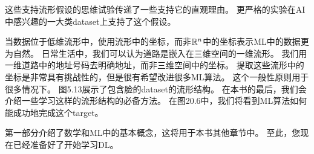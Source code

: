 
这些支持流形假设的思维试验传递了一些支持它的直观理由。
更严格的实验\citep{Cayton-2005,Narayanan+Mitter-NIPS2010,Scholkopf98-book,Roweis2000-lle-small,Tenenbaum2000-isomap,Brand2003,Belkin+Niyogi-nips2003,Donoho+Carrie-03,Weinberger04a}在\gls{AI}中感兴趣的一大类\gls{dataset}上支持了这个假设。

当数据位于低维流形中，使用流形中的坐标，而非$\mathbb{R}^n$中的坐标表示\gls{ML}中的数据更为自然。
日常生活中，我们可以认为道路是嵌入在三维空间的一维流形。
我们用一维道路中的地址号码去明确地址，而非三维空间中的坐标。
提取这些流形中的坐标是非常具有挑战性的，但是很有希望改进很多\gls{ML}算法。
这个一般性原则用于很多情况下。
图5.13展示了包含脸的\gls{dataset}的流形结构。
在本书的最后，我们会介绍一些学习这样的流形结构的必备方法。
在图20.6中，我们将看到\gls{ML}算法如何能成功地完成这个\gls{target}。

第一部分介绍了数学和\gls{ML}中的基本概念，这将用于本书其他章节中。
至此，您现在已经准备好了开始学习\gls{DL}。




